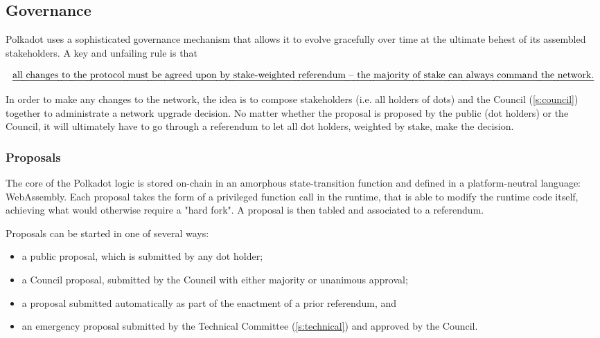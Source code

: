 \subsection{Governance}\label{sec:governance}

Polkadot uses a sophisticated governance mechanism that allows it to evolve gracefully over time at the ultimate behest of its assembled stakeholders. A key and unfailing rule is that 

\begin{align}\label{rule:governance}
\text{\emph{all changes to the protocol must be agreed upon by stake-weighted referendum -- the majority of stake can always command the network.}}
\end{align}

In order to make any changes to the network, the idea is to compose stakeholders (i.e. all holders of dots) and the Council (\autoref{s:council}) together to administrate a network upgrade decision. No matter whether the proposal is proposed by the public (dot holders) or the Council, it will ultimately have to go through a referendum to let all dot holders, weighted by stake, make the decision.



\subsubsection{Proposals}

The core of the Polkadot logic is stored on-chain in an amorphous state-transition function and defined in a platform-neutral language: WebAssembly. Each proposal takes the form of a privileged function call in the runtime, that is able to modify the runtime code itself, achieving what would otherwise require a "hard fork". A proposal is then tabled and associated to a referendum. 

Proposals can be started in one of several ways:
\begin{itemize}
\item a public proposal, which is submitted by any dot holder;
\item a Council proposal, submitted by the Council with either majority or unanimous approval;
\item a proposal submitted automatically as part of the enactment of a prior referendum, and
\item an emergency proposal submitted by the Technical Committee (\autoref{s:technical}) and approved by the Council.
\end{itemize} 

